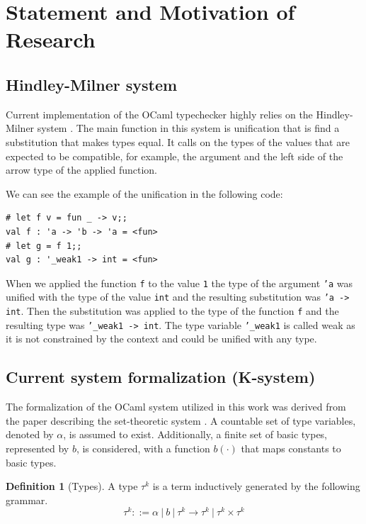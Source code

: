 \documentclass[a4paper,11pt,oneside]{article}
\theoremstyle{definition}
\newtheorem{defsec}{Definition}[section]
\begin{document}
\section{Statement and Motivation of Research}

\subsection{Hindley-Milner system}

Current implementation of the OCaml typechecker highly relies on the Hindley-Milner system \cite{Hindley_1969} \cite{Milner_1978}.
The main function in this system is unification that is find a substitution that makes types equal.
It calls on the types of the values that are expected to be compatible, for example, the argument and the left side of the arrow type of the applied function.

We can see the example of the unification in the following code:

{\ttfamily\begin{verbatim}
# let f v = fun _ -> v;;
val f : 'a -> 'b -> 'a = <fun>
# let g = f 1;;
val g : '_weak1 -> int = <fun>
\end{verbatim}}

When we applied the function \texttt{f} to the value \texttt{1} the type of the argument \texttt{'a} was unified with the type of the value \texttt{int} and the resulting substitution was \texttt{'a -> int}. Then the substitution was applied to the type of the function \texttt{f} and the resulting type was \texttt{'\_weak1 -> int}. The type variable \texttt{'\_weak1} is called weak as it is not constrained by the context and could be unified with any type.

\subsection{Current system formalization (K-system)}

The formalization of the OCaml system utilized in this work was
derived from the paper describing the set-theoretic system \cite{Castagna_2016}.
A countable set of type variables, denoted by $\alpha$, is assumed to exist.
Additionally, a finite set of basic types, represented by $b$, is considered,
with a function $b(\cdot)$ that maps constants to basic types.

\begin{defsec}[Types]
  A type $\tau^k$ is a term inductively generated by the following grammar.
  $$ \tau^k ::= \alpha\ |\ b\ |\ \tau^k \rightarrow \tau^k\ |\ \tau^k \times \tau^k $$
\end{defsec}
\end{document}
